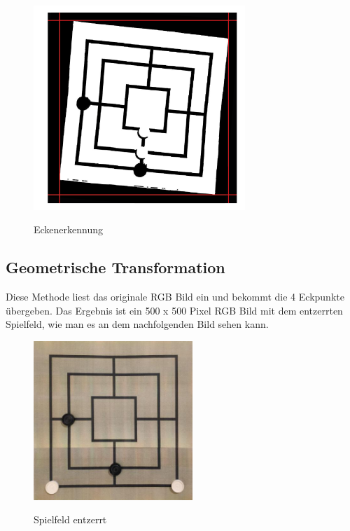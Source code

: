 \documentclass[paper=A4, deutsch]{scrartcl}
\begin{document}
\begin{figure}[ht]
	\centering
		\includegraphics[width=8cm]{Ecken.png}\\
	\caption[Eckenerkennung]{Eckenerkennung}
	\label{fig:nettop}
\end{figure}

\subsection{Geometrische Transformation}
Diese Methode liest das originale RGB Bild ein und bekommt die 4 Eckpunkte übergeben. Das Ergebnis ist ein 500 x 500 Pixel RGB Bild mit dem entzerrten Spielfeld, wie man es an dem nachfolgenden Bild sehen kann.\\

\begin{figure}[ht]
	\centering
		\includegraphics[width=6cm]{Spielbrett_Entzerrt.png}\\
	\caption[Spielfeld entzerrt]{Spielfeld entzerrt}
	\label{fig:nettop}
\end{figure}
\end{document}
